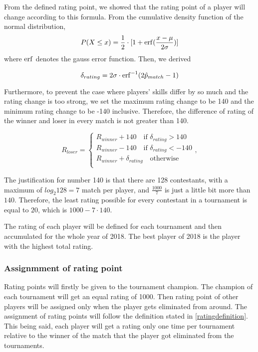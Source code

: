From the defined rating point, we showed that the rating point of a player will change according to this formula. %
\noindent
From the cumulative density function of the normal distribution, %
\begin{equation*} 
    P(X \leq x) = \frac{1}{2} \cdot [ 1 + \operatorname{erf}(\frac{x-\mu}{2\sigma})]
\end{equation*}
\noindent
where $\operatorname{erf}$ denotes the gauss error function. Then, we derived %

\begin{equation}
    \delta_{rating} = 2\sigma \cdot \operatorname{erf}^{-1}(2\hat{p}_{match}-1)
    \label{rating}
\end{equation}

Furthermore, to prevent the case where players' skills differ by so much and the rating change is too strong, we set the maximum rating change to be 140 and the minimum rating change to be -140 inclusive. Therefore, the difference of rating of the winner and loser in every match is not greater than 140. %

\begin{equation}
    R_{loser} = 
    \left\{
        \begin{array}{ll}
            R_{winner} + 140  \quad \text{if } \delta_{rating} > 140 \\
            R_{winner} - 140 \quad \text{if } \delta_{rating} < -140 \\
            R_{winner} + \delta_{rating} \quad \text{otherwise} \\
        \end{array},
    \right.
\end{equation}

The justification for number 140 is that there are 128 contestants, with a maximum of $log_2 128 = 7$ match per player, and $\frac{1000}{7}$ is just a little bit more than $140$. Therefore, the least rating possible for every contestant in a tournament is equal to $20$, which is $1000 - 7\cdot140$. %

The rating of each player will be defined for each tournament and then accumulated for the whole year of 2018. The best player of 2018 is the player with the highest total rating. %

\subsubsection{Assignmment of rating point}
Rating points will firstly be given to the tournament champion. The champion of each tournament will get an equal rating of 1000. Then rating point of other players will be assigned only when the player gets eliminated from around. The assignment of rating points will follow the definition stated in \ref{ratingdefinition}. This being said, each player will get a rating only one time per tournament relative to the winner of the match that the player got eliminated from the tournaments. %

